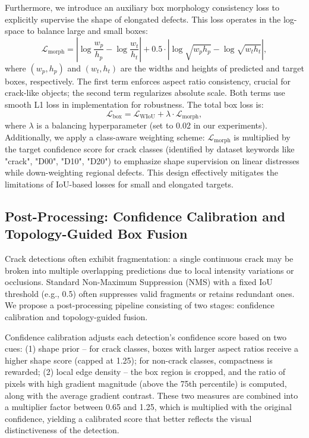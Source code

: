 \documentclass[twocolumn]{sn-jnl}
\begin{document}
	Furthermore, we introduce an auxiliary box morphology consistency loss to explicitly supervise the shape of elongated defects. This loss operates in the log-space to balance large and small boxes:
	\[
	\mathcal{L}_{\text{morph}} = \left| \log\frac{w_p}{h_p} - \log\frac{w_t}{h_t} \right| + 0.5 \cdot \left| \log\sqrt{w_p h_p} - \log\sqrt{w_t h_t} \right|,
	\]
	where \((w_p, h_p)\) and \((w_t, h_t)\) are the widths and heights of predicted and target boxes, respectively. The first term enforces aspect ratio consistency, crucial for crack-like objects; the second term regularizes absolute scale. Both terms use smooth L1 loss in implementation for robustness. The total box loss is:
	\[
	\mathcal{L}_{\text{box}} = \mathcal{L}_{\text{WIoU}} + \lambda \cdot \mathcal{L}_{\text{morph}},
	\]
	where \(\lambda\) is a balancing hyperparameter (set to 0.02 in our experiments). Additionally, we apply a class-aware weighting scheme: \(\mathcal{L}_{\text{morph}}\) is multiplied by the target confidence score for crack classes (identified by dataset keywords like "crack", "D00", "D10", "D20") to emphasize shape supervision on linear distresses while down-weighting regional defects. This design effectively mitigates the limitations of IoU-based losses for small and elongated targets.
	
	\subsection{Post-Processing: Confidence Calibration and Topology-Guided Box Fusion}
	Crack detections often exhibit fragmentation: a single continuous crack may be broken into multiple overlapping predictions due to local intensity variations or occlusions. Standard Non-Maximum Suppression (NMS) with a fixed IoU threshold (e.g., 0.5) often suppresses valid fragments or retains redundant ones. We propose a post-processing pipeline consisting of two stages: confidence calibration and topology-guided fusion.
	
	Confidence calibration adjusts each detection's confidence score based on two cues: (1) shape prior -- for crack classes, boxes with larger aspect ratios receive a higher shape score (capped at 1.25); for non-crack classes, compactness is rewarded; (2) local edge density -- the box region is cropped, and the ratio of pixels with high gradient magnitude (above the 75th percentile) is computed, along with the average gradient contrast. These two measures are combined into a multiplier factor between 0.65 and 1.25, which is multiplied with the original confidence, yielding a calibrated score that better reflects the visual distinctiveness of the detection.
	
\end{document}

